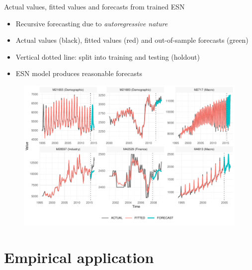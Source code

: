 \documentclass[aspectratio=169]{beamer}
\begin{document}
\begin{frame}[t]{Actual values, fitted values and forecasts from trained ESN}
    \begin{minipage}[t]{0.3\textwidth}
        \vspace{0pt}
        \begin{itemize}
        	\item Recursive forecasting due to \textit{autoregressive nature}
            \item Actual values (black), fitted values (red) and out-of-sample forecasts (green)
			\item Vertical dotted line: split into training and testing (holdout)
			\item ESN model produces reasonable forecasts
        \end{itemize}
    \end{minipage}%
    \hfill
    \begin{minipage}[t]{0.7\textwidth}
        \vspace{0pt}
 		\begin{figure}[H]
		\center
			\includegraphics[scale=0.7]{figures/figure_07_model_forecast_sample_wide.pdf}
		\end{figure}
    \end{minipage}
\end{frame}






\section{Empirical application}
\end{document}
